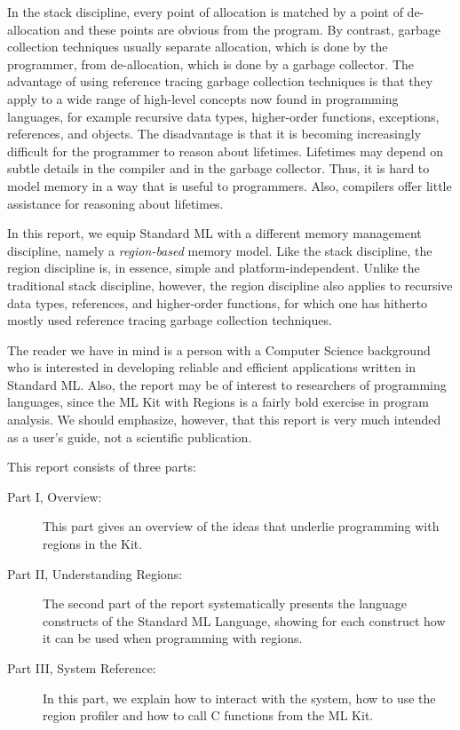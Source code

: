 \documentclass[12pt]{book}
\begin{document}
In the stack discipline, every point of allocation is matched by a
point of de-allocation and these points are obvious from the
program. By contrast, garbage collection techniques usually separate
allocation, which is done by the programmer, from de-allocation, which
is done by a garbage collector.  The advantage of using reference
tracing 
%
garbage collection techniques is that they apply to a wide range of
high-level concepts now found in programming languages, for example
recursive data types, higher-order functions, exceptions, references,
and objects. The disadvantage is that it is becoming increasingly
difficult for the programmer to reason about lifetimes. Lifetimes may
depend on subtle details in the compiler and in the garbage collector.
Thus, it is hard to model memory in a way that is useful to
programmers. Also, compilers offer little assistance for reasoning
about lifetimes.

In this report, we equip Standard ML with a different memory
management discipline, namely a {\em region-based} memory model.  Like
the stack discipline, the region discipline is, in essence, simple and
platform-independent. Unlike the traditional stack discipline,
however, the region discipline also applies to recursive data types,
references, and higher-order functions, for which one has hitherto
mostly used reference tracing garbage collection techniques.

The reader we have in mind is a person with a Computer Science
background who is interested in developing reliable and efficient
applications written in Standard ML. Also, the report may be of
interest to researchers of programming languages, since the ML Kit
with Regions is a fairly bold exercise in program analysis. We should
emphasize, however, that this report is very much intended as a user's
guide, not a scientific publication.

This report consists of three parts:
\begin{description}
\item[Part I, Overview:] This part gives an overview of the ideas
  that underlie programming with regions in the Kit.
\item[Part II, Understanding Regions:] The second part of the report
  systematically presents the language constructs of the Standard ML
  Language, showing for each construct how it can be used when
  programming with regions.
\item[Part III, System Reference:] In this part, we explain how to
  interact with the system, how to use the region profiler and how to
  call C functions from the ML Kit.
\end{description}
\end{document}
